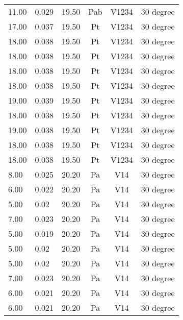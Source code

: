 \begin{table}[t]
\begin{tabular}{l | l | l | c | c | l}
11.00          & 0.029           & 19.50  & Pab      & V1234  & 30 degree           \\
17.00          & 0.037           & 19.50  & Pt       & V1234  & 30 degree           \\
18.00          & 0.038           & 19.50  & Pt       & V1234  & 30 degree           \\
18.00          & 0.038           & 19.50  & Pt       & V1234  & 30 degree           \\
18.00          & 0.038           & 19.50  & Pt       & V1234  & 30 degree           \\
18.00          & 0.038           & 19.50  & Pt       & V1234  & 30 degree           \\
19.00          & 0.039           & 19.50  & Pt       & V1234  & 30 degree           \\
18.00          & 0.038           & 19.50  & Pt       & V1234  & 30 degree           \\
19.00          & 0.038           & 19.50  & Pt       & V1234  & 30 degree           \\
18.00          & 0.038           & 19.50  & Pt       & V1234  & 30 degree           \\
18.00          & 0.038           & 19.50  & Pt       & V1234  & 30 degree           \\
8.00           & 0.025           & 20.20  & Pa       & V14    & 30 degree           \\
6.00           & 0.022           & 20.20  & Pa       & V14    & 30 degree           \\
5.00           & 0.02            & 20.20  & Pa       & V14    & 30 degree           \\
7.00           & 0.023           & 20.20  & Pa       & V14    & 30 degree           \\
5.00           & 0.019           & 20.20  & Pa       & V14    & 30 degree           \\
5.00           & 0.02            & 20.20  & Pa       & V14    & 30 degree           \\
5.00           & 0.02            & 20.20  & Pa       & V14    & 30 degree           \\
7.00           & 0.023           & 20.20  & Pa       & V14    & 30 degree           \\
6.00           & 0.021           & 20.20  & Pa       & V14    & 30 degree           \\
6.00           & 0.021           & 20.20  & Pa       & V14    & 30 degree           \\
\end{tabular}
\end{table}

